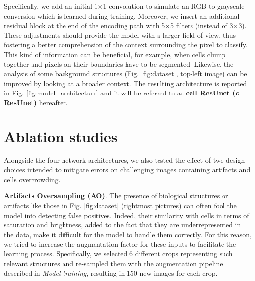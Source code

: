 Specifically, we add an initial 1$\times$1 convolution to simulate an RGB to grayscale conversion which is learned during training.
Moreover, we insert an additional residual block at the end of the encoding path with 5$\times$5 filters (instead of 3$\times$3). These adjustments should provide the model with a larger field of view, thus fostering a better comprehension of the context surrounding the pixel to classify.
This kind of information can be beneficial, for example, when cells clump together and pixels on their boundaries have to be segmented. 
Likewise, the analysis of some background structures (Fig. \ref{fig:dataset}, top-left image) can be improved by looking at a broader context.
The resulting architecture is reported in Fig. \ref{fig:model_architecture} and it will be referred to as \textbf{cell ResUnet (c-ResUnet)} hereafter.

\section{Ablation studies}
\label{sec:ablation_studies}

Alongside the four network architectures, we also tested the effect of two design choices intended to mitigate errors on challenging images containing artifacts and cells overcrowding.

\noindent\textbf{Artifacts Oversampling (AO)}. 
The presence of biological structures or artifacts like those in Fig. \ref{fig:dataset} (rightmost pictures) can often fool the model into detecting false positives. Indeed, their similarity with cells in terms of saturation and brightness, added to the fact that they are underrepresented in the data, make it difficult for the model to handle them correctly.
For this reason, we tried to increase the augmentation factor for these inputs to facilitate the learning process. Specifically, we selected 6 different crops representing such relevant structures and re-sampled them with the augmentation pipeline described in \textit{Model training}, resulting in 150 new images for each crop. 

